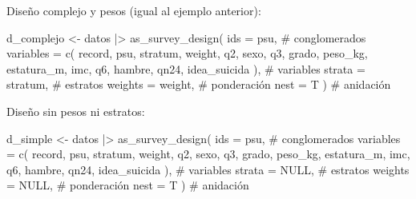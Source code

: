 \documentclass[
  spanish,
  a4paper,
]{scrbook}
\newenvironment{Shaded}{\begin{snugshade}}{\end{snugshade}}
\newcommand{\AttributeTok}[1]{\textcolor[rgb]{0.40,0.45,0.13}{#1}}
\newcommand{\CommentTok}[1]{\textcolor[rgb]{0.37,0.37,0.37}{#1}}
\newcommand{\ConstantTok}[1]{\textcolor[rgb]{0.56,0.35,0.01}{#1}}
\newcommand{\FunctionTok}[1]{\textcolor[rgb]{0.28,0.35,0.67}{#1}}
\newcommand{\NormalTok}[1]{\textcolor[rgb]{0.00,0.23,0.31}{#1}}
\newcommand{\OtherTok}[1]{\textcolor[rgb]{0.00,0.23,0.31}{#1}}
\newcommand{\SpecialCharTok}[1]{\textcolor[rgb]{0.37,0.37,0.37}{#1}}
\begin{document}
Diseño complejo y pesos (igual al ejemplo anterior):

\begin{Shaded}
\begin{Highlighting}[]
\NormalTok{d\_complejo }\OtherTok{\textless{}{-}}\NormalTok{ datos }\SpecialCharTok{|\textgreater{}}
  \FunctionTok{as\_survey\_design}\NormalTok{(}
    \AttributeTok{ids =}\NormalTok{ psu, }\CommentTok{\# conglomerados}
    \AttributeTok{variables =} \FunctionTok{c}\NormalTok{(}
\NormalTok{      record,}
\NormalTok{      psu,}
\NormalTok{      stratum,}
\NormalTok{      weight,}
\NormalTok{      q2,}
\NormalTok{      sexo,}
\NormalTok{      q3,}
\NormalTok{      grado,}
\NormalTok{      peso\_kg,}
\NormalTok{      estatura\_m,}
\NormalTok{      imc,}
\NormalTok{      q6,}
\NormalTok{      hambre,}
\NormalTok{      qn24,}
\NormalTok{      idea\_suicida}
\NormalTok{    ), }\CommentTok{\# variables}
    \AttributeTok{strata =}\NormalTok{ stratum, }\CommentTok{\# estratos}
    \AttributeTok{weights =}\NormalTok{ weight, }\CommentTok{\# ponderación}
    \AttributeTok{nest =}\NormalTok{ T}
\NormalTok{  ) }\CommentTok{\# anidación}
\end{Highlighting}
\end{Shaded}

Diseño sin pesos ni estratos:

\begin{Shaded}
\begin{Highlighting}[]
\NormalTok{d\_simple }\OtherTok{\textless{}{-}}\NormalTok{ datos }\SpecialCharTok{|\textgreater{}}
  \FunctionTok{as\_survey\_design}\NormalTok{(}
    \AttributeTok{ids =}\NormalTok{ psu, }\CommentTok{\# conglomerados}
    \AttributeTok{variables =} \FunctionTok{c}\NormalTok{(}
\NormalTok{      record,}
\NormalTok{      psu,}
\NormalTok{      stratum,}
\NormalTok{      weight,}
\NormalTok{      q2,}
\NormalTok{      sexo,}
\NormalTok{      q3,}
\NormalTok{      grado,}
\NormalTok{      peso\_kg,}
\NormalTok{      estatura\_m,}
\NormalTok{      imc,}
\NormalTok{      q6,}
\NormalTok{      hambre,}
\NormalTok{      qn24,}
\NormalTok{      idea\_suicida}
\NormalTok{    ), }\CommentTok{\# variables}
    \AttributeTok{strata =} \ConstantTok{NULL}\NormalTok{, }\CommentTok{\# estratos}
    \AttributeTok{weights =} \ConstantTok{NULL}\NormalTok{, }\CommentTok{\# ponderación}
    \AttributeTok{nest =}\NormalTok{ T}
\NormalTok{  ) }\CommentTok{\# anidación}
\end{Highlighting}
\end{Shaded}
\end{document}
